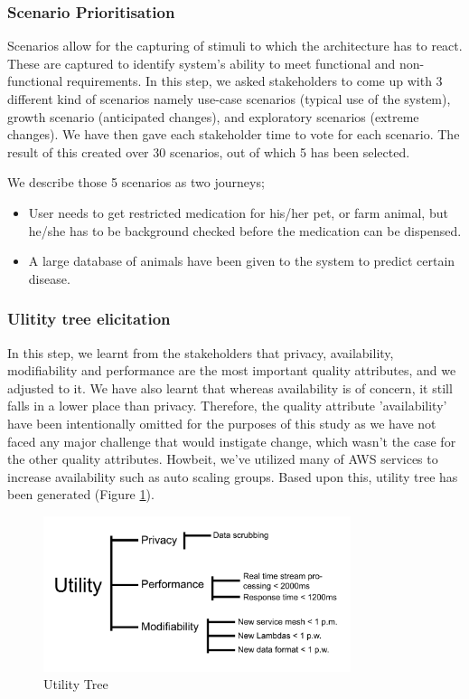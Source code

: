 \documentclass[10pt, conference]{IEEEtran}
\begin{document}
\subsubsection{Scenario Prioritisation}

Scenarios allow for the capturing of stimuli to which the architecture has to react. These are captured to identify system's ability to meet functional and non-functional requirements. In this step, we asked stakeholders to come up with 3 different kind of scenarios namely use-case scenarios (typical use of the system), growth scenario (anticipated changes), and exploratory scenarios (extreme changes). We have then gave each stakeholder time to vote for each scenario. The result of this created over 30 scenarios, out of which 5 has been selected.

We describe those 5 scenarios as two journeys;

\begin{itemize}
    \item User needs to get restricted medication for his/her pet, or farm animal, but he/she has to be background checked before the medication can be dispensed.
    \item A large database of animals have been given to the system to predict certain disease.
\end{itemize}

\subsubsection{Ulitity tree elicitation}

In this step, we learnt from the stakeholders that privacy, availability, modifiability and performance are the most important quality attributes, and we adjusted to it. We have also learnt that whereas availability is of concern, it still falls in a lower place than privacy. Therefore, the quality attribute 'availability' have been intentionally omitted for the purposes of this study as we have not faced any major challenge that would instigate change, which wasn't the case for the other quality attributes. Howbeit, we've utilized many of AWS services to increase availability such as auto scaling groups. Based upon this, utility tree has been generated (Figure \ref{UtilityFig}).


\begin{figure}[hbt!]
    \centering
    \includegraphics[width=9cm]{Utility Tree.pdf}
    \caption{Utility Tree} \label{UtilityFig}
\end{figure}
\end{document}
